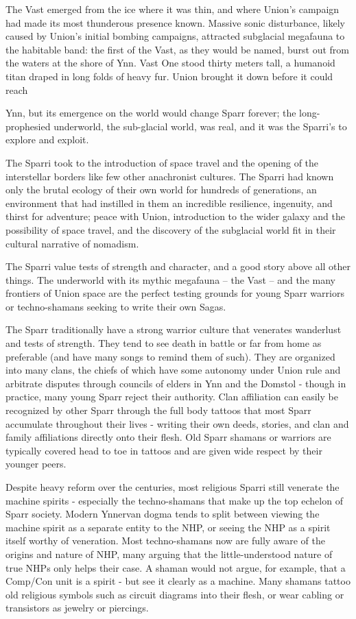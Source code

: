 The Vast emerged from the ice where it was thin, and where Union's campaign had made its most
thunderous presence known. Massive sonic disturbance, likely caused by Union's initial bombing
campaigns, attracted subglacial megafauna to the habitable band: the first of the Vast, as they
would be named, burst out from the waters at the shore of Ynn. Vast One stood thirty meters tall,
a humanoid titan draped in long folds of heavy fur. Union brought it down before it could reach

Ynn, but its emergence on the world would change Sparr forever; the long-prophesied
underworld, the sub-glacial world, was real, and it was the Sparri's to explore and exploit.

The Sparri took to the introduction of space travel and the opening of the interstellar borders like
few other anachronist cultures. The Sparri had known only the brutal ecology of their own world
for hundreds of generations, an environment that had instilled in them an incredible resilience,
ingenuity, and thirst for adventure; peace with Union, introduction to the wider galaxy and the
possibility of space travel, and the discovery of the subglacial world fit in their cultural narrative of
nomadism.

The Sparri value tests of strength and character, and a good story above all other things. The
underworld with its mythic megafauna -- the Vast -- and the many frontiers of Union space are the
perfect testing grounds for young Sparr warriors or techno-shamans seeking to write their own
Sagas.

The Sparr traditionally have a strong warrior culture that venerates wanderlust and tests of
strength. They tend to see death in battle or far from home as preferable (and have many songs
to remind them of such). They are organized into many clans, the chiefs of which have some
autonomy under Union rule and arbitrate disputes through councils of elders in Ynn and the
Domstol - though in practice, many young Sparr reject their authority. Clan affiliation can easily be
recognized by other Sparr through the full body tattoos that most Sparr accumulate throughout
their lives - writing their own deeds, stories, and clan and family affiliations directly onto their flesh.
Old Sparr shamans or warriors are typically covered head to toe in tattoos and are given wide
respect by their younger peers.

Despite heavy reform over the centuries, most religious Sparri still venerate the machine spirits -
especially the techno-shamans that make up the top echelon of Sparr society. Modern Ynnervan
dogma tends to split between viewing the machine spirit as a separate entity to the NHP, or
seeing the NHP as a spirit itself worthy of veneration. Most techno-shamans now are fully aware
of the origins and nature of NHP, many arguing that the little-understood nature of true NHPs only
helps their case. A shaman would not argue, for example, that a Comp/Con unit is a spirit - but
see it clearly as a machine. Many shamans tattoo old religious symbols such as circuit diagrams
into their flesh, or wear cabling or transistors as jewelry or piercings.

